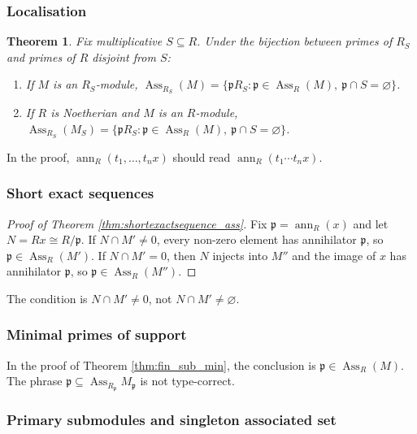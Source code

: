 \documentclass[12pt]{article}
\theoremstyle{plain}
\newtheorem{thm}{Theorem}[subsection] %
\theoremstyle{definition}
\begin{document}
\subsubsection*{Localisation}

\begin{thm}\label{thm:primes_loc_corr}
Fix multiplicative $S\subseteq R$. Under the bijection between primes of $R_S$ and primes of $R$ disjoint from $S$:
\begin{enumerate}
\item If $M$ is an $R_S$-module, $\operatorname{Ass}_{R_S}(M)=\{\mathfrak{p}R_S:\mathfrak{p}\in\operatorname{Ass}_R(M),\ \mathfrak{p}\cap S=\varnothing\}$.
\item If $R$ is Noetherian and $M$ is an $R$-module, $\operatorname{Ass}_{R_S}(M_S)=\{\mathfrak{p}R_S:\mathfrak{p}\in\operatorname{Ass}_R(M),\ \mathfrak{p}\cap S=\varnothing\}$.
\end{enumerate}
\end{thm}

In the proof, $\operatorname{ann}_R(t_1,\ldots,t_n x)$ should read $\operatorname{ann}_R(t_1\cdots t_n x)$.

\subsubsection*{Short exact sequences}

\begin{proof}[Proof of Theorem \ref{thm:shortexactsequence_ass}]
Fix $\mathfrak{p}=\operatorname{ann}_R(x)$ and let $N=Rx\cong R/\mathfrak{p}$. If $N\cap M'\ne 0$, every non-zero element has annihilator $\mathfrak{p}$, so $\mathfrak{p}\in\operatorname{Ass}_R(M')$. If $N\cap M'=0$, then $N$ injects into $M''$ and the image of $x$ has annihilator $\mathfrak{p}$, so $\mathfrak{p}\in\operatorname{Ass}_R(M'')$.
\end{proof}

The condition is $N\cap M'\ne 0$, not $N\cap M'\ne\varnothing$.

\subsubsection*{Minimal primes of support}

In the proof of Theorem \ref{thm:fin_sub_min}, the conclusion is $\mathfrak{p}\in\operatorname{Ass}_R(M)$. The phrase $\mathfrak{p}\subseteq\operatorname{Ass}_{R_{\mathfrak{p}}}M_{\mathfrak{p}}$ is not type-correct.

\subsubsection*{Primary submodules and singleton associated set}
\end{document}

